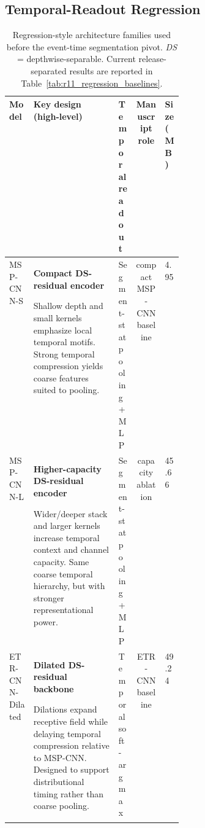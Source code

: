 \documentclass[12pt]{article}
\renewcommand{\baselinestretch}{1.05}
\begin{document}
\subsection{Temporal-Readout Regression}
\label{sec:rt_reg_zoo}


\begin{table}[!t]
\centering
\caption{Regression-style architecture families used before the event-time segmentation pivot. \emph{DS} = depthwise-separable. Current release-separated results are reported in Table~\ref{tab:r11_regression_baselines}.}
\label{tab:rt_regression_models}

\begingroup
\renewcommand{\baselinestretch}{1}\selectfont %
\footnotesize                                %
\setlength{\tabcolsep}{3pt}
\renewcommand{\arraystretch}{0.95}

\begin{tabularx}{\linewidth}{@{} 
p{0.14\linewidth} 
Y 
p{0.10\linewidth} 
c 
p{0.09\linewidth} 
@{}}

\toprule
\textbf{Model} & \textbf{Key design (high-level)} & \textbf{Temporal readout} & \textbf{Manuscript role} & \textbf{Size (MB)} \\

\midrule
MSP-CNN-S &
\textbf{Compact DS-residual encoder}\par
Shallow depth and small kernels emphasize local temporal motifs.
Strong temporal compression yields coarse features suited to pooling. &
Segment-stat pooling + MLP & compact MSP-CNN baseline & 4.95 \\

\addlinespace[0.3em]

MSP-CNN-L &
\textbf{Higher-capacity DS-residual encoder}\par
Wider/deeper stack and larger kernels increase temporal context and channel capacity.
Same coarse temporal hierarchy, but with stronger representational power. &
Segment-stat pooling + MLP & capacity ablation & 45.66 \\

\addlinespace[0.3em]

ETR-CNN-Dilated &
\textbf{Dilated DS-residual backbone}\par
Dilations expand receptive field while delaying temporal compression relative to MSP-CNN.
Designed to support distributional timing rather than coarse pooling. &
Temporal soft-argmax & ETR-CNN baseline & 49.24 \\


\end{tabularx}
\end{table}
\end{document}
